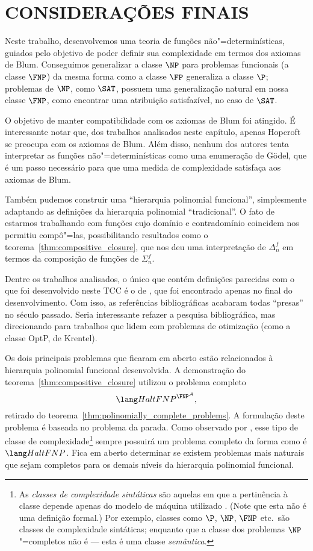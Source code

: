 \chapter{CONSIDERAÇÕES FINAIS}

Neste trabalho,
desenvolvemos uma teoria de funções não"=determinísticas,
guiados pelo objetivo de poder definir sua complexidade
em termos dos axiomas de Blum.
Conseguimos generalizar a classe $\NP$ para problemas funcionais
(a classe $\FNP$)
da mesma forma como a classe $\FP$ generaliza a classe $\P$;
problemas de $\NP$,
como $\SAT$,
possuem uma generalização natural em nossa classe $\FNP$,
como encontrar uma atribuição satisfazível, no caso de $\SAT$.

O objetivo de manter compatibilidade com os axiomas de Blum foi atingido.
É interessante notar que, dos trabalhos analisados neste capítulo,
apenas Hopcroft se preocupa com os axiomas de Blum.
Além disso,
nenhum dos autores tenta interpretar as funções não"=determinísticas
como uma enumeração de Gödel,
que é um passo necessário para que uma medida de complexidade
satisfaça aos axiomas de Blum.

Também pudemos construir uma ``hierarquia polinomial funcional'',
simplesmente adaptando as definições da hierarquia polinomial ``tradicional''.
O fato de estarmos trabalhando com funções
cujo domínio e contradomínio coincidem
nos permitiu compô"=las,
possibilitando resultados como o teorema~\ref{thm:compositive_closure},
que nos deu uma interpretação de $\Delta_n^f$
em termos da composição de funções de $\Sigma_n^f$.

Dentre os trabalhos analisados,
o único que contém definições parecidas com o que foi desenvolvido neste TCC
é o de \cite[p.~3]{Krentel1988},
que foi encontrado apenas no final do desenvolvimento.
Com isso,
as referências bibliográficas acabaram todas ``presas''
no século passado.
Seria interessante refazer a pesquisa bibliográfica,
mas direcionando para trabalhos que lidem com problemas de otimização
(como a classe OptP, de Krentel).

Os dois principais problemas que ficaram em aberto
estão relacionados à hierarquia polinomial funcional desenvolvida.
A demonstração do teorema~\ref{thm:compositive_closure}
utilizou o problema completo
\begin{equation*}
    \HaltFNP^{\FNP^\mathcal A},
\end{equation*}
retirado do teorema~\ref{thm:polinomially_complete_problems}.
A formulação deste problema é baseada no problema da parada.
Como observado por ,
esse tipo de classe de complexidade\footnote{
    As \emph{classes de complexidade sintáticas}
    são aquelas em que a pertinência à classe
    depende apenas do modelo de máquina utilizado
    \cite[p.~255]{Papadimitriou1994}.
    (Note que esta não é uma definição formal.)
    Por exemplo,
    classes como $\P$, $\NP$, $\FNP$ etc.\ são classes de complexidade sintáticas;
    enquanto que a classe dos problemas $\NP$"=completos não é
    --- esta é uma classe \emph{semântica}.
}
sempre possuirá um problema completo da forma como é $\HaltFNP$.
Fica em aberto determinar se existem problemas mais naturais
que sejam completos para os demais níveis da hierarquia polinomial funcional.

